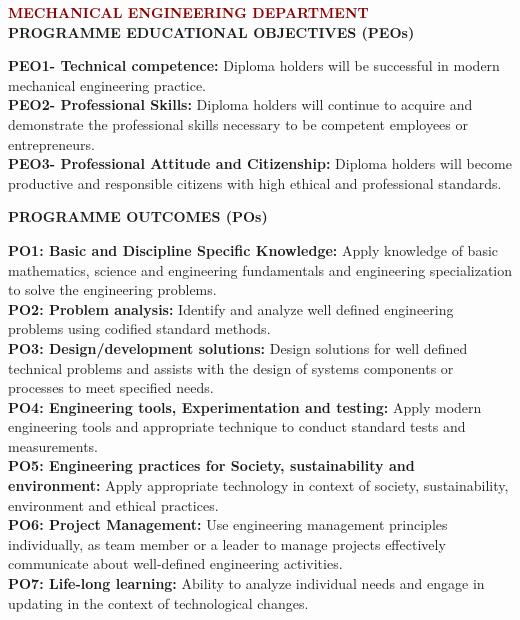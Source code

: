 \documentclass[12pt,a4paper]{article}
\begin{document}
\vspace*{-5mm}
\begin{center}
  {\fontsize{14}{18}\selectfont \bfseries \textcolor{darkred}{MECHANICAL ENGINEERING DEPARTMENT}}\\[4mm]
  {\fontsize{12}{15}\selectfont \bfseries \textcolor{navyblue}{PROGRAMME EDUCATIONAL OBJECTIVES (PEOs)}}\\[2mm]
\end{center}
\noindent
\textbf{PEO1- Technical competence:} Diploma holders will be successful in modern mechanical engineering practice.\\[1.5mm]
\textbf{PEO2- Professional Skills:} Diploma holders will continue to acquire and demonstrate the professional skills necessary to be competent employees or entrepreneurs.\\[1.5mm]
\textbf{PEO3- Professional Attitude and Citizenship:} Diploma holders will become productive and responsible citizens with high ethical and professional standards.

\begin{center}
  \vspace{3mm}
  {\fontsize{12}{15}\selectfont \bfseries \textcolor{navyblue}{PROGRAMME OUTCOMES (POs)}}\\[2mm]
\end{center}
\noindent
\textbf{PO1: Basic and Discipline Specific Knowledge:} Apply knowledge of basic mathematics, science and engineering fundamentals and engineering specialization to solve the engineering problems.\\[1.5mm]
\textbf{PO2: Problem analysis:} Identify and analyze well defined engineering problems using codified standard methods.\\[1.5mm]
\textbf{PO3: Design/development solutions:} Design solutions for well defined technical problems and assists with the design of systems components or processes to meet specified needs.\\[1.5mm]
\textbf{PO4: Engineering tools, Experimentation and testing:} Apply modern engineering tools and appropriate technique to conduct standard tests and measurements.\\[1.5mm]
\textbf{PO5: Engineering practices for Society, sustainability and environment:} Apply appropriate technology in context of society, sustainability, environment and ethical practices.\\[1.5mm]
\textbf{PO6: Project Management:} Use engineering management principles individually, as team member or a leader to manage projects effectively communicate about well-defined engineering activities.\\[1.5mm]
\textbf{PO7: Life-long learning:} Ability to analyze individual needs and engage in updating in the context of technological changes.
\end{document}
